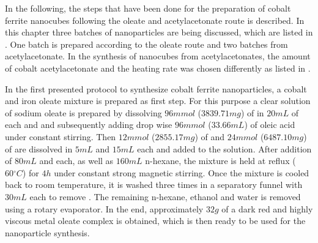 \documentclass[\main/dresen_thesis.tex]{subfiles}
\begin{document}
  \label{sec:monolayers:nanoparticle:synthesisOleatesAcAc}
  In the following, the steps that have been done for the preparation of cobalt ferrite nanocubes following the oleate and acetylacetonate route is described.
  In this chapter three batches of nanoparticles are being discussed, which are listed in .
  One batch is prepared according to the oleate route and two batches from acetylacetonate.
  In the synthesis of nanocubes from acetylacetonates, the amount of cobalt acetylacetonate and the heating rate was chosen differently as listed in .

    In the first presented protocol to synthesize cobalt ferrite nanoparticles, a cobalt and iron oleate mixture is prepared as first step.
    For this purpose a clear solution of sodium oleate is prepared by dissolving $96 \unit{mmol}$ ($3839.71 \unit{mg}$) of  in $20 \unit{mL}$ of each  and  and subsequently adding drop wise $96 \unit{mmol}$ ($33.66 \unit{mL}$) of oleic acid under constant stirring.
    Then $12 \unit{mmol}$ ($2855.17 \unit{mg}$) of  and $24 \unit{mmol}$ ($6487.10 \unit{mg}$) of  are dissolved in $5 \unit{mL}$  and $15 \unit{mL}$  each and added to the solution.
    After addition of $80 \unit{mL}$  and  each, as well as $160 \unit{mL}$ n-hexane, the mixture is held at reflux ($60 \unit{^\circ C}$) for $4 \unit{h}$ under constant strong magnetic stirring.
    Once the mixture is cooled back to room temperature, it is washed three times in a separatory funnel with $30 \unit{mL}$  each to remove .
    The remaining n-hexane, ethanol and water is removed using a rotary evaporator.
    In the end, approximately $32 \unit{g}$ of a dark red and highly viscous metal oleate complex is obtained, which is then ready to be used for the nanoparticle synthesis.
\end{document}
